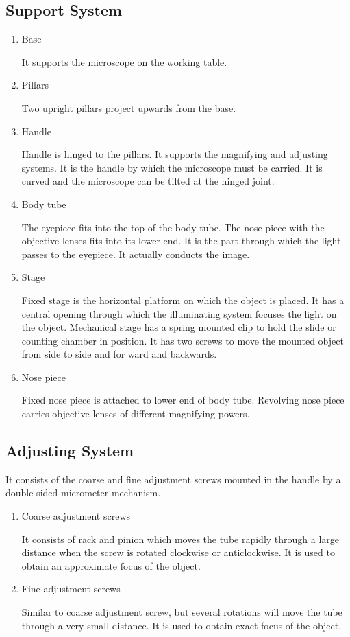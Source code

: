 \documentclass[a4paper,12pt,openany,twoside]{book}
\begin{document}
		\subsection*{Support System}
		\begin{enumerate}
			\item{Base \par It supports the microscope on the working table.}
			\item{Pillars \par Two upright pillars project upwards from the base.}
			\item{Handle \par Handle is hinged to the pillars. It supports the magnifying and adjusting systems. It is the handle by which the microscope must be carried. It is curved and the microscope can be tilted at the hinged joint.}
			\item{Body tube \par The eyepiece fits into the top of the body tube. The nose piece with the objective lenses fits into its lower end. It is the part through which the light passes to the eyepiece. It actually conducts the image.}
			\item{Stage \par Fixed stage is the horizontal platform on which the object is placed. It has a central opening through which the illuminating system focuses the light on the object. Mechanical stage has a spring mounted clip to hold the slide or counting chamber in position. It has two screws to move the mounted object from side to side and for ward and backwards.}
			\item {Nose piece \par Fixed nose piece is attached to lower end of body tube. Revolving nose piece carries objective lenses of different magnifying powers.}
		\end{enumerate}

		\subsection*{Adjusting System}
		It consists of the coarse and fine adjustment screws mounted in the handle by a double sided micrometer mechanism.
		\begin{enumerate}
			\item{Coarse adjustment screws \par It consists of rack and pinion which moves the tube rapidly through a large distance when the screw is rotated clockwise or anticlockwise. It is used to obtain an approximate focus of the object.}
			\item{Fine adjustment screws \par Similar to coarse adjustment screw, but several rotations will move the tube through a very small distance. It is used to obtain exact focus of the object.}
		\end{enumerate}
\end{document}
